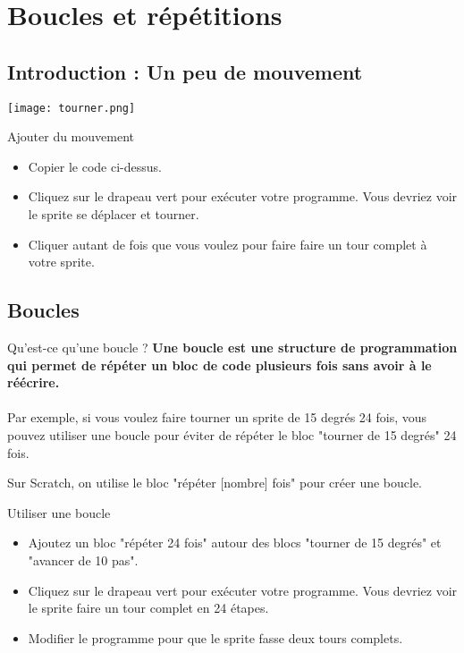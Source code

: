 

\section{Boucles et répétitions}
\subsection{Introduction : Un peu de mouvement}

\begin{center}
    \texttt{[image: tourner.png]}
\end{center}
\begin{UPSTIManipulation}{Ajouter du mouvement}
\begin{itemize}
\item Copier le code ci-dessus.
\item Cliquez sur le drapeau vert pour exécuter votre programme. Vous devriez voir le sprite se déplacer et tourner.
\item Cliquer autant de fois que vous voulez pour faire faire un tour complet à votre sprite.
\end{itemize}
\end{UPSTIManipulation}



\pagebreak

\subsection{Boucles}
\begin{UPSTIinfor}{Qu'est-ce qu'une boucle ?}
    \vspace{1em}
\textbf{Une boucle est une structure de programmation qui permet de répéter un bloc de code plusieurs fois sans avoir à le réécrire. }\\\\
Par exemple, si vous voulez faire tourner un sprite de 15 degrés 24 fois, vous pouvez utiliser une boucle pour éviter de répéter le bloc "tourner de 15 degrés" 24 fois.
\end{UPSTIinfor}

Sur Scratch, on utilise le bloc "répéter [nombre] fois" pour créer une boucle.

\begin{UPSTIManipulation}{Utiliser une boucle}
\begin{itemize}
\item Ajoutez un bloc "répéter 24 fois" autour des blocs "tourner de 15 degrés" et "avancer de 10 pas".
\item Cliquez sur le drapeau vert pour exécuter votre programme. Vous devriez voir le sprite faire un tour complet en 24 étapes.
\item Modifier le programme pour que le sprite fasse deux tours complets.
\end{itemize}
\end{UPSTIManipulation}

